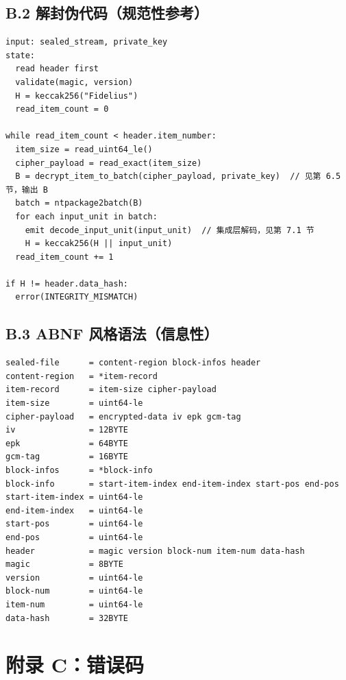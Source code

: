 \documentclass[11pt,a4paper]{article}
\begin{document}
\subsection{B.2 解封伪代码（规范性参考）}
\begin{verbatim}
input: sealed_stream, private_key
state:
  read header first
  validate(magic, version)
  H = keccak256("Fidelius")
  read_item_count = 0

while read_item_count < header.item_number:
  item_size = read_uint64_le()
  cipher_payload = read_exact(item_size)
  B = decrypt_item_to_batch(cipher_payload, private_key)  // 见第 6.5 节，输出 B
  batch = ntpackage2batch(B)
  for each input_unit in batch:
    emit decode_input_unit(input_unit)  // 集成层解码，见第 7.1 节
    H = keccak256(H || input_unit)
  read_item_count += 1

if H != header.data_hash:
  error(INTEGRITY_MISMATCH)
\end{verbatim}

\subsection{B.3 ABNF 风格语法（信息性）}
\begin{verbatim}
sealed-file      = content-region block-infos header
content-region   = *item-record
item-record      = item-size cipher-payload
item-size        = uint64-le
cipher-payload   = encrypted-data iv epk gcm-tag
iv               = 12BYTE
epk              = 64BYTE
gcm-tag          = 16BYTE
block-infos      = *block-info
block-info       = start-item-index end-item-index start-pos end-pos
start-item-index = uint64-le
end-item-index   = uint64-le
start-pos        = uint64-le
end-pos          = uint64-le
header           = magic version block-num item-num data-hash
magic            = 8BYTE
version          = uint64-le
block-num        = uint64-le
item-num         = uint64-le
data-hash        = 32BYTE
\end{verbatim}

\section{附录 C：错误码}
\end{document}
